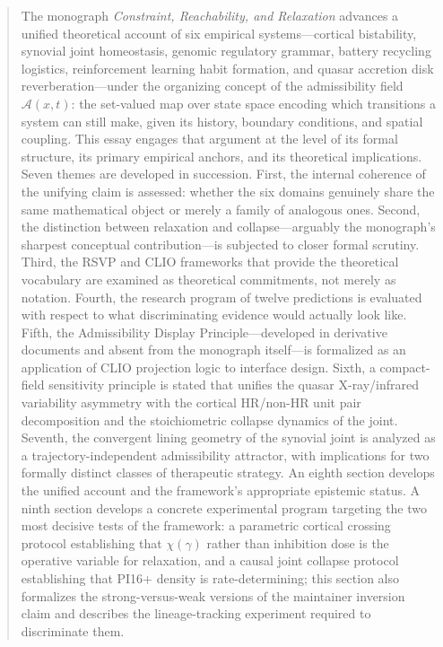 \documentclass[12pt, a4paper]{article}
\theoremstyle{definition}
\begin{document}
\begin{abstract}
\noindent
The monograph \textit{Constraint, Reachability, and Relaxation} advances a unified theoretical account of six empirical systems---cortical bistability, synovial joint homeostasis, genomic regulatory grammar, battery recycling logistics, reinforcement learning habit formation, and quasar accretion disk reverberation---under the organizing concept of the admissibility field $\mathcal{A}(x,t)$: the set-valued map over state space encoding which transitions a system can still make, given its history, boundary conditions, and spatial coupling. This essay engages that argument at the level of its formal structure, its primary empirical anchors, and its theoretical implications. Seven themes are developed in succession. First, the internal coherence of the unifying claim is assessed: whether the six domains genuinely share the same mathematical object or merely a family of analogous ones. Second, the distinction between relaxation and collapse---arguably the monograph's sharpest conceptual contribution---is subjected to closer formal scrutiny. Third, the RSVP and CLIO frameworks that provide the theoretical vocabulary are examined as theoretical commitments, not merely as notation. Fourth, the research program of twelve predictions is evaluated with respect to what discriminating evidence would actually look like. Fifth, the Admissibility Display Principle---developed in derivative documents and absent from the monograph itself---is formalized as an application of CLIO projection logic to interface design. Sixth, a compact-field sensitivity principle is stated that unifies the quasar X-ray/infrared variability asymmetry with the cortical HR/non-HR unit pair decomposition and the stoichiometric collapse dynamics of the joint. Seventh, the convergent lining geometry of the synovial joint is analyzed as a trajectory-independent admissibility attractor, with implications for two formally distinct classes of therapeutic strategy. An eighth section develops the unified account and the framework's appropriate epistemic status. A ninth section develops a concrete experimental program targeting the two most decisive tests of the framework: a parametric cortical crossing protocol establishing that $\chi(\gamma)$ rather than inhibition dose is the operative variable for relaxation, and a causal joint collapse protocol establishing that PI16+ density is rate-determining; this section also formalizes the strong-versus-weak versions of the maintainer inversion claim and describes the lineage-tracking experiment required to discriminate them.
\end{abstract}
\end{document}
